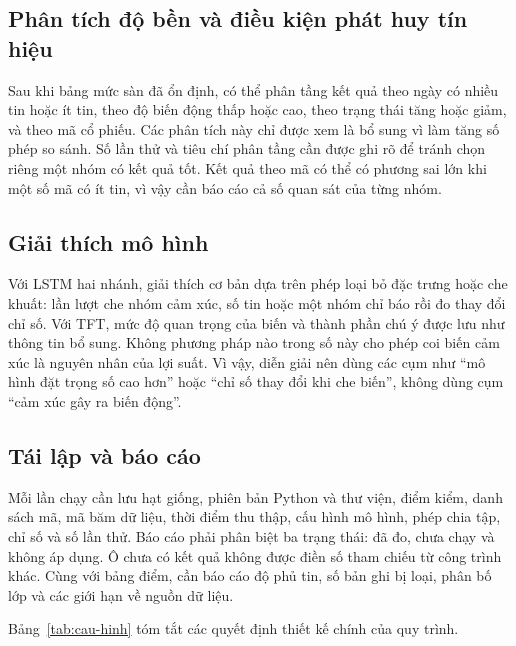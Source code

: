 \subsection{Phân tích độ bền và điều kiện phát huy tín hiệu}

Sau khi bảng mức sàn đã ổn định, có thể phân tầng kết quả theo ngày có nhiều tin
hoặc ít tin, theo độ biến động thấp hoặc cao, theo trạng thái tăng hoặc giảm, và
theo mã cổ phiếu. Các phân tích này chỉ được xem là bổ sung vì làm tăng số phép so
sánh. Số lần thử và tiêu chí phân tầng cần được ghi rõ để tránh chọn riêng một nhóm
có kết quả tốt. Kết quả theo mã có thể có phương sai lớn khi một số mã có ít tin, vì
vậy cần báo cáo cả số quan sát của từng nhóm.

\subsection{Giải thích mô hình}

Với LSTM hai nhánh, giải thích cơ bản dựa trên phép loại bỏ đặc trưng hoặc che khuất:
lần lượt che nhóm cảm xúc, số tin hoặc một nhóm chỉ báo rồi đo thay đổi chỉ số. Với
TFT, mức độ quan trọng của biến và thành phần chú ý được lưu như thông tin bổ sung.
Không phương pháp nào trong số này cho phép coi biến cảm xúc là nguyên nhân của lợi
suất. Vì vậy, diễn giải nên dùng các cụm như ``mô hình đặt trọng số cao hơn'' hoặc
``chỉ số thay đổi khi che biến'', không dùng cụm ``cảm xúc gây ra biến động''.

\subsection{Tái lập và báo cáo}

Mỗi lần chạy cần lưu hạt giống, phiên bản Python và thư viện, điểm kiểm, danh sách
mã, mã băm dữ liệu, thời điểm thu thập, cấu hình mô hình, phép chia tập, chỉ số và
số lần thử. Báo cáo phải phân biệt ba trạng thái: đã đo, chưa chạy và không áp dụng.
Ô chưa có kết quả không được điền số tham chiếu từ công trình khác. Cùng với bảng
điểm, cần báo cáo độ phủ tin, số bản ghi bị loại, phân bố lớp và các giới hạn về
nguồn dữ liệu.

Bảng~\ref{tab:cau-hinh} tóm tắt các quyết định thiết kế chính của quy trình.

